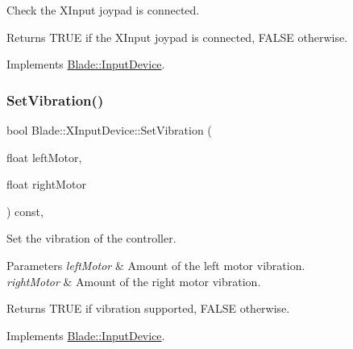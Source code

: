 Check the X\+Input joypad is connected. 

\begin{DoxyReturn}{Returns}
T\+R\+UE if the X\+Input joypad is connected, F\+A\+L\+SE otherwise. 
\end{DoxyReturn}


Implements \hyperlink{class_blade_1_1_input_device_aa9cc6d93af07d3fb28db79f663752c4c}{Blade\+::\+Input\+Device}.

\mbox{\label{class_blade_1_1_x_input_device_a9119d7193d51c1003ee6bb8074518ef4}} 
\subsubsection{\texorpdfstring{Set\+Vibration()}{SetVibration()}}
{\footnotesize\ttfamily bool Blade\+::\+X\+Input\+Device\+::\+Set\+Vibration (\begin{DoxyParamCaption}\item[{float}]{left\+Motor,  }\item[{float}]{right\+Motor }\end{DoxyParamCaption}) const\hspace{0.3cm}{\ttfamily [override]}, {\ttfamily [virtual]}}



Set the vibration of the controller. 


\begin{DoxyParams}{Parameters}
{\em left\+Motor} & Amount of the left motor vibration. \\
\hline
{\em right\+Motor} & Amount of the right motor vibration. \\
\hline
\end{DoxyParams}
\begin{DoxyReturn}{Returns}
T\+R\+UE if vibration supported, F\+A\+L\+SE otherwise. 
\end{DoxyReturn}


Implements \hyperlink{class_blade_1_1_input_device_a49858a83478b83d04f95d746cc6a4b75}{Blade\+::\+Input\+Device}.

\mbox{\label{class_blade_1_1_x_input_device_a32a94ba12dd032a93a56b766073c7159}} 
